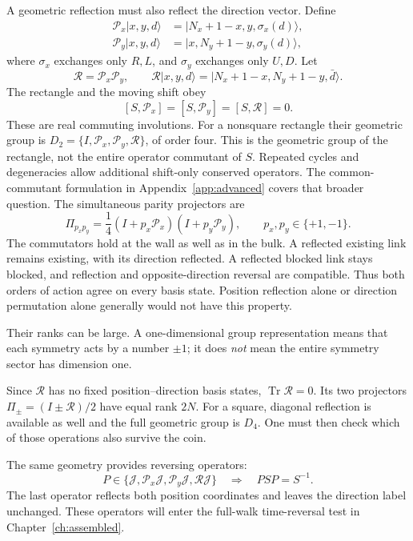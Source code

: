 \documentclass[11pt,a4paper,oneside]{report}
\newcommand{\ket}[1]{\lvert #1\rangle}
\newcommand{\Id}{I}
\newcommand{\Tr}{\operatorname{Tr}}
\numberwithin{equation}{chapter}
\begin{document}
A geometric reflection must also reflect the direction vector. Define
\begin{align}
\mathcal P_x\ket{x,y,d}
&=\ket{N_x+1-x,y,\sigma_x(d)},\\
\mathcal P_y\ket{x,y,d}
&=\ket{x,N_y+1-y,\sigma_y(d)},
\end{align}
where \(\sigma_x\) exchanges only \(R,L\), and \(\sigma_y\)
exchanges only \(U,D\). Let
\begin{equation}
\mathcal R=\mathcal P_x\mathcal P_y,\qquad
\mathcal R\ket{x,y,d}
=\ket{N_x+1-x,N_y+1-y,\bar d}.
\end{equation}
The rectangle and the moving shift obey
\begin{equation}
\boxed{[S,\mathcal P_x]=[S,\mathcal P_y]=[S,\mathcal R]=0.}
\end{equation}
These are real commuting involutions. For a nonsquare rectangle their
geometric group is
\(D_2=\{\Id,\mathcal P_x,\mathcal P_y,\mathcal R\}\), of order four.
This is the geometric group of the rectangle, not the entire operator
commutant of \(S\). Repeated cycles and degeneracies allow additional
shift-only conserved operators. The common-commutant formulation in
Appendix~\ref{app:advanced} covers that broader question.
The simultaneous parity projectors are
\begin{equation}
\Pi_{p_xp_y}=\frac14(\Id+p_x\mathcal P_x)(\Id+p_y\mathcal P_y),
\qquad p_x,p_y\in\{+1,-1\}.
\end{equation}
The commutators hold at the wall as well as in the bulk. A reflected
existing link remains existing, with its direction reflected. A
reflected blocked link stays blocked, and reflection and opposite-direction
reversal are compatible. Thus both orders of action agree on every
basis state. Position reflection alone or direction permutation alone
generally would not have this property.

Their ranks can be large. A one-dimensional group representation means
that each symmetry acts by a number \(\pm1\); it does \emph{not}
mean the entire symmetry sector has dimension one.

Since \(\mathcal R\) has no fixed position--direction basis states,
\(\Tr\mathcal R=0\). Its two projectors
\(\Pi_\pm=(\Id\pm\mathcal R)/2\) have equal rank \(2N\).
For a square, diagonal reflection is available as well and the full
geometric group is \(D_4\). One must then check which of those
operations also survive the coin.

The same geometry provides reversing operators:
\begin{equation}
P\in\{\mathcal J,\mathcal P_x\mathcal J,
\mathcal P_y\mathcal J,\mathcal R\mathcal J\}
\quad\Longrightarrow\quad PSP=S^{-1}.
\label{eq:allreversers}
\end{equation}
The last operator reflects both position coordinates and leaves the
direction label unchanged. These operators will enter the full-walk
time-reversal test in Chapter~\ref{ch:assembled}.
\end{document}
